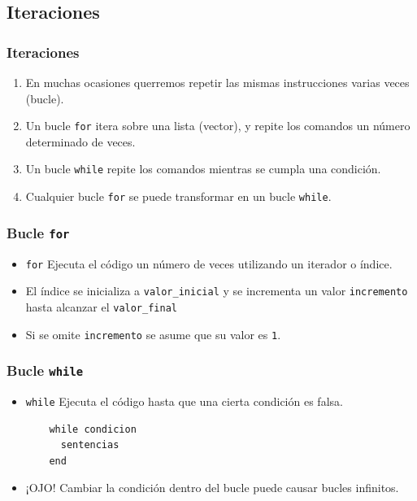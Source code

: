 \subsection{Iteraciones}
\begin{frame}[label=iteraciones]
 \frametitle{Iteraciones}
 \begin{enumerate}
  \item En muchas ocasiones querremos repetir las mismas instrucciones varias
    veces (\alert{bucle}).
  \item Un bucle \alert{\texttt{for}} itera sobre una lista (vector), y repite
    los comandos un número determinado de veces.
  \item Un bucle \alert{\texttt{while}} repite los comandos mientras se cumpla
    una condición.
  \item Cualquier bucle \alert{\texttt{for}} se puede transformar en un bucle
    \alert{\texttt{while}}.
 \end{enumerate}
\end{frame}
\begin{frame}[label=bucle_for,fragile]
 \frametitle{Bucle \texttt{for}}
 \begin{itemize}
  \item \alert{\texttt{for}} Ejecuta el código un número de veces utilizando un
    iterador o índice.
 \begin{small}
   \lstI
 \end{small}
  \item El índice se inicializa a \texttt{valor\_inicial} y se incrementa un
    valor \texttt{incremento} hasta alcanzar el \texttt{valor\_final}
  \item Si se omite \texttt{incremento} se asume que su valor es \texttt{1}.
 \end{itemize}
\end{frame}
\begin{frame}[label=bucle_while,fragile]
 \frametitle{Bucle \texttt{while}}
 \begin{itemize}
  \item \alert{\texttt{while}} Ejecuta el código hasta que una cierta condición
    es \alert{falsa}.
 \begin{verbatim}
    while condicion
      sentencias
    end
 \end{verbatim}
  \item \alert{¡OJO!} Cambiar la condición dentro del bucle puede causar
    \alert{bucles infinitos}.
 \end{itemize}
\end{frame}
